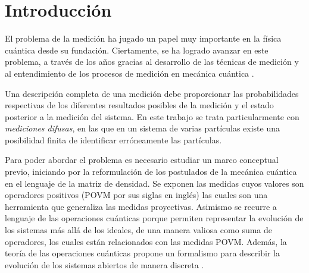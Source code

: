 \documentclass[12pt,oneside]{book}\raggedbottom{} %
\begin{document}
{{\begin{enumerate}
\end{enumerate}
\newpage

\chapter*{Introducción}  %

El problema de la medición ha jugado un papel muy importante en la física
cuántica desde su fundación. Ciertamente, se ha logrado avanzar en este
problema, a través de los años gracias al desarrollo de las técnicas de
medición y al entendimiento de los procesos de medición en mecánica cuántica
{\cite{Pineda_2021}} . 


Una descripción completa de una medición debe proporcionar las probabilidades
respectivas de los diferentes resultados posibles de la medición y el estado
posterior a la medición del sistema. En este trabajo se trata particularmente
con \textit{mediciones difusas}, en las que en un sistema de varias partículas
existe una posibilidad finita de identificar erróneamente las partículas.


Para poder abordar el problema es necesario estudiar un marco conceptual
previo, iniciando por la reformulación de los postulados de la mecánica
cuántica en el lenguaje de la matriz de densidad. Se exponen las medidas cuyos
valores son operadores positivos (POVM por sus siglas en inglés) las cuales son
una herramienta que generaliza las medidas proyectivas. Asimismo se recurre a
lenguaje de las operaciones cuánticas porque permiten representar la evolución
de los sistemas más allá de los ideales, de una manera valiosa como suma de
operadores, los cuales están relacionados con las medidas POVM\@. Además, la
teoría de las operaciones cuánticas propone un formalismo para describir la
evolución de los sistemas abiertos de manera discreta
{\cite{nielsen_chuang_2010}}.

}}
\end{document}
